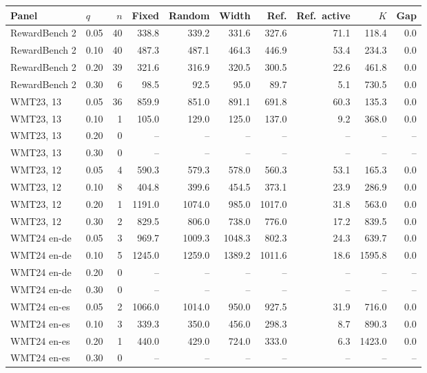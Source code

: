 \begin{table}[t]
\centering\small


\begin{tabular}{llrrrrrrrr}
\toprule
Panel & $q$ & $n$ & Fixed & Random & Width & Ref. & Ref.\ active & $K$ & Gap \\
\midrule
RewardBench 2 & 0.05 & 40 & 338.8 & 339.2 & 331.6 & 327.6 & 71.1 & 118.4 & 0.0 \\
RewardBench 2 & 0.10 & 40 & 487.3 & 487.1 & 464.3 & 446.9 & 53.4 & 234.3 & 0.0 \\
RewardBench 2 & 0.20 & 39 & 321.6 & 316.9 & 320.5 & 300.5 & 22.6 & 461.8 & 0.0 \\
RewardBench 2 & 0.30 & 6 & 98.5 & 92.5 & 95.0 & 89.7 & 5.1 & 730.5 & 0.0 \\
WMT23, 13 & 0.05 & 36 & 859.9 & 851.0 & 891.1 & 691.8 & 60.3 & 135.3 & 0.0 \\
WMT23, 13 & 0.10 & 1 & 105.0 & 129.0 & 125.0 & 137.0 & 9.2 & 368.0 & 0.0 \\
WMT23, 13 & 0.20 & 0 & -- & -- & -- & -- & -- & -- & -- \\
WMT23, 13 & 0.30 & 0 & -- & -- & -- & -- & -- & -- & -- \\
WMT23, 12 & 0.05 & 4 & 590.3 & 579.3 & 578.0 & 560.3 & 53.1 & 165.3 & 0.0 \\
WMT23, 12 & 0.10 & 8 & 404.8 & 399.6 & 454.5 & 373.1 & 23.9 & 286.9 & 0.0 \\
WMT23, 12 & 0.20 & 1 & 1191.0 & 1074.0 & 985.0 & 1017.0 & 31.8 & 563.0 & 0.0 \\
WMT23, 12 & 0.30 & 2 & 829.5 & 806.0 & 738.0 & 776.0 & 17.2 & 839.5 & 0.0 \\
WMT24 en-de & 0.05 & 3 & 969.7 & 1009.3 & 1048.3 & 802.3 & 24.3 & 639.7 & 0.0 \\
WMT24 en-de & 0.10 & 5 & 1245.0 & 1259.0 & 1389.2 & 1011.6 & 18.6 & 1595.8 & 0.0 \\
WMT24 en-de & 0.20 & 0 & -- & -- & -- & -- & -- & -- & -- \\
WMT24 en-de & 0.30 & 0 & -- & -- & -- & -- & -- & -- & -- \\
WMT24 en-es & 0.05 & 2 & 1066.0 & 1014.0 & 950.0 & 927.5 & 31.9 & 716.0 & 0.0 \\
WMT24 en-es & 0.10 & 3 & 339.3 & 350.0 & 456.0 & 298.3 & 8.7 & 890.3 & 0.0 \\
WMT24 en-es & 0.20 & 1 & 440.0 & 429.0 & 724.0 & 333.0 & 6.3 & 1423.0 & 0.0 \\
WMT24 en-es & 0.30 & 0 & -- & -- & -- & -- & -- & -- & -- \\

\end{tabular}
\end{table}
